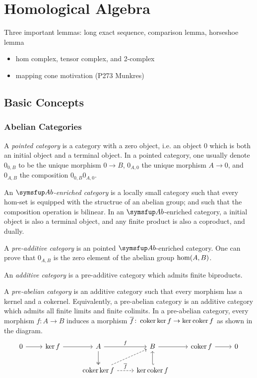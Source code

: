 
\chapter{Homological Algebra}

Three important lemmas: long exact sequence, comparison lemma, horseshoe lemma

\begin{itemize}\color{red}
  \item hom complex, tensor complex, and 2-complex
  \item mapping cone motivation (P273 Munkres)
\end{itemize}

\section{Basic Concepts}

\subsection{Abelian Categories}

A \emph{pointed category} is a category with a zero object, i.e. an object 0 which is both an initial object and a terminal object. In a pointed category, one usually denote $0_{0, B}$ to be the unique morphism $0\to B$, $0_{A, 0}$ the unique morphism $A\to 0$, and $0_{A, B}$ the composition $0_{0, B}0_{A, 0}$.

An \emph{$\AB$-enriched category} is a locally small category such that every hom-set is equipped with the structrue of an abelian group; and such that the composition operation is bilinear. In an $\AB$-enriched category, a initial object is also a terminal object, and any finite product is also a coproduct, and dually.

A \emph{pre-additive category} is an pointed $\AB$-enriched category. One can prove that $0_{A,B}$ is the zero element of the abelian group $\operatorname{hom}(A, B)$.

An \emph{additive category} is a pre-additive category which admits finite biproducts.

A \emph{pre-abelian category} is an additive category such that every morphism has a kernel and a cokernel. Equivalently, a pre-abelian category is an additive category which admits all finite limits and finite colimits. In a pre-abelian category, every morphism $f\colon A\to B$ induces a morphism $\overline{f}\colon\operatorname{coker}\operatorname{ker} f\to \operatorname{ker}\operatorname{coker} f$ as shown in the diagram.
\begin{equation*}
  \begin{tikzcd}
    0 & \KER f & A & B & \COKER f & 0\\
    & & \COKER\KER f & \KER\COKER f
    \arrow[from=1-1,]{1-2}[]{}
    \arrow[from=1-2,]{1-3}[]{}
    \arrow[from=1-3,]{1-4}[]{f}
    \arrow[from=1-4,]{1-5}[]{}
    \arrow[from=1-5,]{1-6}[]{}
    \arrow[from=1-3,two heads,]{2-3}[]{}
    \arrow[from=1-4,hookleftarrow,]{2-4}[]{}
    \arrow[from=2-3,dashed,]{1-4}[]{}
    \arrow[from=2-3,dashed,]{2-4}[]{\overline{f}}
  \end{tikzcd}
\end{equation*}


